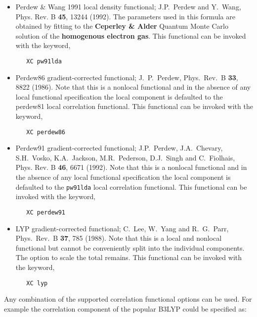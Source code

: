 \begin{itemize}
\item Perdew \& Wang 1991 local density functional;  J.P.~Perdew
  and Y.~Wang, Phys. Rev. B {\bf 45}, 13244 (1992).  The parameters
  used in this formula are obtained by fitting to the {\bf Ceperley \&
  Alder\footnotemark[1]} Quantum Monte Carlo solution of the {\bf
  homogenous electron gas}.  This functional can be invoked with the
  keyword,
  
\begin{verbatim}
   XC pw91lda
\end{verbatim}

\item Perdew86 gradient-corrected functional; J.~P.~Perdew, Phys.~Rev.~B 
  {\bf33}, 8822 (1986).  Note that this is a nonlocal functional and
  in the absence of any local functional specification the local
  component is defaulted to the perdew81 local correlation
  functional. This functional can be invoked with the
  keyword,
  
\begin{verbatim}
   XC perdew86
\end{verbatim}

\item Perdew91 gradient-corrected functional;  J.P.~Perdew,
  J.A.~Chevary, S.H.~Vosko, K.A.~Jackson, M.R.~Pederson, D.J.~Singh
  and C.~Fiolhais, Phys. Rev. B {\bf 46}, 6671 (1992). Note that this
  is a nonlocal functional and in the absence of any local functional 
  specification the local component is defaulted to the \verb+pw91lda+ local 
  correlation functional.  This functional can be invoked with the keyword,

\begin{verbatim}
   XC perdew91
\end{verbatim}

\item LYP gradient-corrected functional; C.~Lee, W.~Yang and
   R.~G.~Parr, Phys.~Rev.~B {\bf 37}, 785 (1988).  Note that this
  is a local and nonlocal functional but cannot be conveniently split
  into the individual components.  The option to scale the total remains.
  This functional can be invoked with the keyword,
  
\begin{verbatim}
   XC lyp
\end{verbatim}

\end{itemize}

\fussy

Any combination of the supported correlation functional options can be
used.  For example the correlation component of the popular B3LYP
could be specified as:

